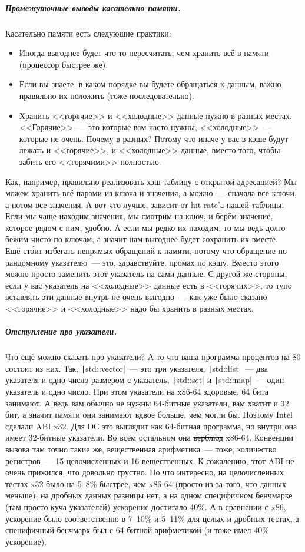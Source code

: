 \documentclass{article}
\begin{document}
    \subparagraph{Промежуточные выводы касательно памяти.}
    Касательно памяти есть следующие практики:
    \begin{itemize}
        \item Иногда выгоднее будет что-то пересчитать, чем хранить всё в памяти (процессор быстрее же).
        \item Если вы знаете, в каком порядке вы будете обращаться к данным, важно правильно их положить (тоже последовательно).
        \item Хранить <<горячие>> и <<холодные>> данные нужно в разных местах. <<Горячие>>~--- это которые вам часто нужны, <<холодные>>~--- которые не очень. Почему в разных? Потому что иначе у вас в кэше будут лежать и <<горячие>>, и <<холодные>> данные, вместо того, чтобы забить его <<горячими>> полностью.
    \end{itemize}
    Как, например, правильно реализовать хэш-таблицу с открытой адресацией? Мы можем хранить всё парами из ключа и значения, а можно~--- сначала все ключи, а потом все значения. А вот что лучше, зависит от hit rate'а нашей таблицы. Если мы чаще находим значения, мы смотрим на ключ, и берём значение, которое рядом с ним, удобно. А если мы редко их находим, то мы ведь долго бежим чисто по ключам, а значит нам выгоднее будет сохранить их вместе.\\
    Ещё ст\'{о}ит избегать непрямых обращений к памяти, потому что обращение по рандомному указателю~--- это, здравствуйте, промах по кэшу. Вместо этого можно просто заменить этот указатель на сами данные. С другой же стороны, если у вас указатель на <<холодные>> данные есть в <<горячих>>, то тупо вставлять эти данные внутрь не очень выгодно~--- как уже было сказано <<горячие>> и <<холодные>> надо бы хранить в разных местах.
    \subparagraph{Отступление про указатели.}
    Что ещё можно сказать про указатели? А то что ваша программа процентов на 80 состоит из них. Так, \texttt|std::vector|~--- это три указателя, \texttt|std::list|~--- два указателя и одно число размером с указатель, \texttt|std::set| и \texttt|std::map|~--- один указатель и одно число. При этом указатели на x86-64 здоровые, 64 бита занимают. А ведь вам обычно не нужны 64-битные указатели, вам хватит и 32 бит, а значит памяти они занимают вдвое больше, чем могли бы. Поэтому Intel сделали ABI x32. Для ОС это выглядит как 64-битная программа, но внутри она имеет 32-битные указатели. Во всём остальном она \sout{верблюд} x86-64. Конвенции вызова там точно такие же, вещественная арифметика~--- тоже, количество регистров~--- 15 целочисленных и 16 вещественных. К сожалению, этот ABI не очень прижился, что довольно грустно. Но что интересно, на целочисленных тестах x32 было на 5--8\% быстрее, чем x86-64 (просто из-за того, что данных меньше), на дробных данных разницы нет, а на одном специфичном бенчмарке (там просто куча указателей) ускорение достигало 40\%. А в сравнении с x86, ускорение было соответственно в 7--10\% и 5--11\% для целых и дробных тестах, а специфичный бенчмарк был с 64-битной арифметикой (и тоже имел 40\% ускорение).
\end{document}
